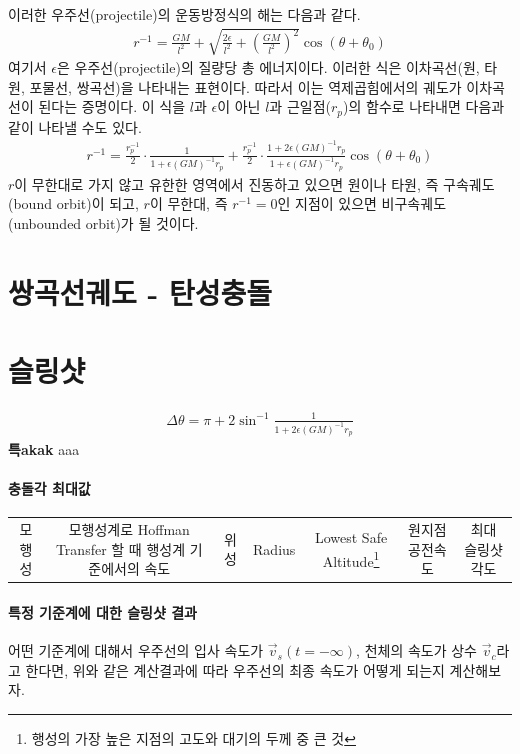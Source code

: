 \documentclass[9pt]{amsbook}
\begin{document}
이러한 우주선(projectile)의 운동방정식의 해는 다음과 같다.
\begin{align}
	r^{-1} = \frac{GM}{l^2} + \sqrt{\frac{2\epsilon}{l^2}+\left(\frac{GM}{l^2}\right)^2}\cos(\theta+\theta_0)
\end{align}
여기서 $\epsilon$은 우주선(projectile)의 질량당 총 에너지이다. 이러한 식은 이차곡선(원, 타원, 포물선, 쌍곡선)을 나타내는 표현이다. 따라서 이는 역제곱힘에서의 궤도가 이차곡선이 된다는 증명이다.
이 식을 $l$과 $\epsilon$이 아닌 $l$과 근일점($r_p$)의 함수로 나타내면 다음과 같이 나타낼 수도 있다.
\begin{align}
	r^{-1} = \frac{r_p^{-1}}{2}\cdot\frac{1}{1+\epsilon (GM)^{-1}r_p} +\frac{r_p^{-1}}{2}\cdot\frac{1+2\epsilon (GM)^{-1}r_p}{1+\epsilon (GM)^{-1}r_p}\cos(\theta+\theta_0)
\end{align}
$r$이 무한대로 가지 않고 유한한 영역에서 진동하고 있으면 원이나 타원, 즉 구속궤도(bound orbit)이 되고, $r$이 무한대, 즉 $r^{-1}=0$인 지점이 있으면 비구속궤도(unbounded orbit)가 될 것이다.

\section{쌍곡선궤도 - 탄성충돌}
\section{슬링샷}

\begin{align}
	\Delta \theta = \pi + 2\sin^{-1}\frac{1}{{1+2\epsilon (GM)^{-1}r_p}}
\end{align}
\textbf{\textsf{\large 특akak}}\;\; aaa

\paragraph{충돌각 최대값}
\begin{table}
\begin{tabular}{|c|c|c|c|c|c|c|}
모행성&모행성계로 Hoffman Transfer 할 때 행성계 기준에서의 속도& 위성& Radius& Lowest Safe Altitude\footnote{행성의 가장 높은 지점의 고도와 대기의 두께 중 큰 것}&원지점 공전속도 &최대 슬링샷 각도
\end{tabular}
\end{table}
\paragraph{특정 기준계에 대한 슬링샷 결과}
어떤 기준계에 대해서 우주선의 입사 속도가 $\vec{v}_s(t=-\infty)$, 천체의 속도가 상수 $\vec{v}_c$라고 한다면, 위와 같은 계산결과에 따라 우주선의 최종 속도가 어떻게 되는지 계산해보자.
\end{document}
